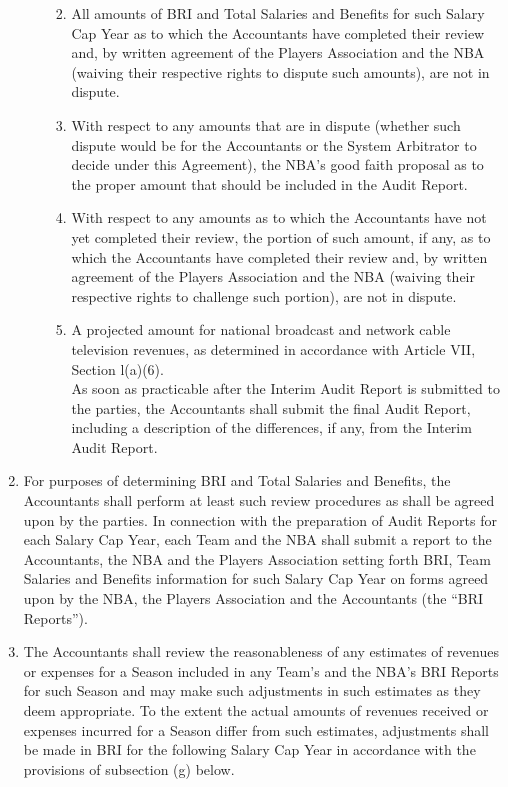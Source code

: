\documentclass[
]{book}
\providecommand{\tightlist}{%
  \setlength{\itemsep}{0pt}\setlength{\parskip}{0pt}}
\begin{document}
\begin{enumerate}
\begin{enumerate}
    \begin{enumerate}
    \def\labelenumiii{(\roman{enumiii})}
    \tightlist
    \item
      All amounts of BRI and Total Salaries and Benefits for such Salary Cap Year as to which the Accountants have completed their review and, by written agreement of the Players Association and the NBA (waiving their respective rights to dispute such amounts), are not in dispute.
    \item
      With respect to any amounts that are in dispute (whether such dispute would be for the Accountants or the System Arbitrator to decide under this Agreement), the NBA's good faith proposal as to the proper amount that should be included in the Audit Report.
    \item
      With respect to any amounts as to which the Accountants have not yet completed their review, the portion of such amount, if any, as to which the Accountants have completed their review and, by written agreement of the Players Association and the NBA (waiving their respective rights to challenge such portion), are not in dispute.
    \item
      A projected amount for national broadcast and network cable television revenues, as determined in accordance with Article VII, Section l(a)(6).\\
      As soon as practicable after the Interim Audit Report is submitted to the parties, the Accountants shall submit the final Audit Report, including a description of the differences, if any, from the Interim Audit Report.
    \end{enumerate}
  \end{enumerate}
\item
  For purposes of determining BRI and Total Salaries and Benefits, the Accountants shall perform at least such review procedures as shall be agreed upon by the parties. In connection with the preparation of Audit Reports for each Salary Cap Year, each Team and the NBA shall submit a report to the Accountants, the NBA and the Players Association setting forth BRI, Team Salaries and Benefits information for such Salary Cap Year on forms agreed upon by the NBA, the Players Association and the Accountants (the ``BRI Reports'').
\item
  The Accountants shall review the reasonableness of any estimates of revenues or expenses for a Season included in any Team's and the NBA's BRI Reports for such Season and may make such adjustments in such estimates as they deem appropriate. To the extent the actual amounts of revenues received or expenses incurred for a Season differ from such estimates, adjustments shall be made in BRI for the following Salary Cap Year in accordance with the provisions of subsection (g) below.

\end{enumerate}
\end{document}
